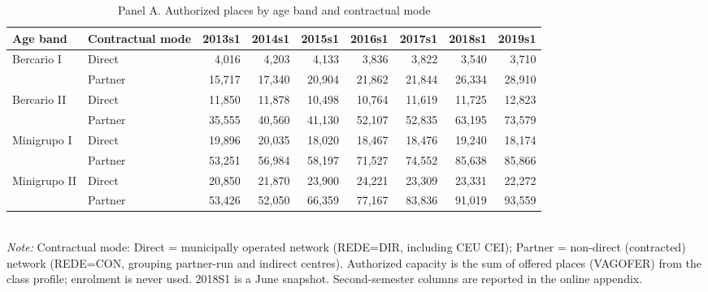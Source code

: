 \begin{table}[htbp]\centering
\caption{Panel A. Authorized places by age band and contractual mode}
\label{tab:T2a_capacidade}
\small
\setlength{\tabcolsep}{4pt}
\begin{tabular}{llrrrrrrr}
\toprule
Age band & Contractual mode & 2013s1 & 2014s1 & 2015s1 & 2016s1 & 2017s1 & 2018s1 & 2019s1 \\
\midrule
Bercario I & Direct & 4,016 & 4,203 & 4,133 & 3,836 & 3,822 & 3,540 & 3,710 \\
 & Partner & 15,717 & 17,340 & 20,904 & 21,862 & 21,844 & 26,334 & 28,910 \\
Bercario II & Direct & 11,850 & 11,878 & 10,498 & 10,764 & 11,619 & 11,725 & 12,823 \\
 & Partner & 35,555 & 40,560 & 41,130 & 52,107 & 52,835 & 63,195 & 73,579 \\
Minigrupo I & Direct & 19,896 & 20,035 & 18,020 & 18,467 & 18,476 & 19,240 & 18,174 \\
 & Partner & 53,251 & 56,984 & 58,197 & 71,527 & 74,552 & 85,638 & 85,866 \\
Minigrupo II & Direct & 20,850 & 21,870 & 23,900 & 24,221 & 23,309 & 23,331 & 22,272 \\
 & Partner & 53,426 & 52,050 & 66,359 & 77,167 & 83,836 & 91,019 & 93,559 \\
\bottomrule
\end{tabular}
\\[3pt]{\footnotesize \textit{Note:} Contractual mode: Direct = municipally operated network (REDE=DIR, including CEU CEI); Partner = non-direct (contracted) network (REDE=CON, grouping partner-run and indirect centres). Authorized capacity is the sum of offered places (VAGOFER) from the class profile; enrolment is never used. 2018S1 is a June snapshot. Second-semester columns are reported in the online appendix.}
\end{table}
